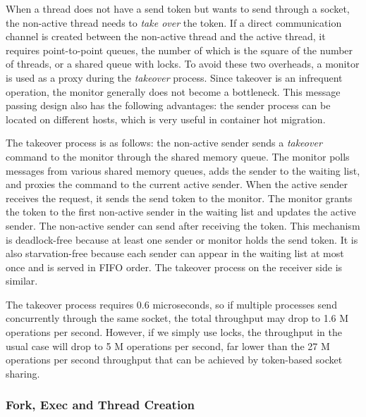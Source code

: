 When a thread does not have a send token but wants to send through a socket, the non-active thread needs to \emph{take over} the token. If a direct communication channel is created between the non-active thread and the active thread, it requires point-to-point queues, the number of which is the square of the number of threads, or a shared queue with locks. To avoid these two overheads, a monitor is used as a proxy during the \emph{takeover} process. Since takeover is an infrequent operation, the monitor generally does not become a bottleneck. This message passing design also has the following advantages: the sender process can be located on different hosts, which is very useful in container hot migration.

The takeover process is as follows: the non-active sender sends a \emph{takeover} command to the monitor through the shared memory queue. The monitor polls messages from various shared memory queues, adds the sender to the waiting list, and proxies the command to the current active sender. When the active sender receives the request, it sends the send token to the monitor. The monitor grants the token to the first non-active sender in the waiting list and updates the active sender. The non-active sender can send after receiving the token. This mechanism is deadlock-free because at least one sender or monitor holds the send token. It is also starvation-free because each sender can appear in the waiting list at most once and is served in FIFO order. The takeover process on the receiver side is similar.

The takeover process requires 0.6 microseconds, so if multiple processes send concurrently through the same socket, the total throughput may drop to 1.6 M operations per second. However, if we simply use locks, the throughput in the usual case will drop to 5 M operations per second, far lower than the 27 M operations per second throughput that can be achieved by token-based socket sharing.


\subsubsection{Fork, Exec and Thread Creation}
\label{socksdirect:subsubsec:fork_fork}


